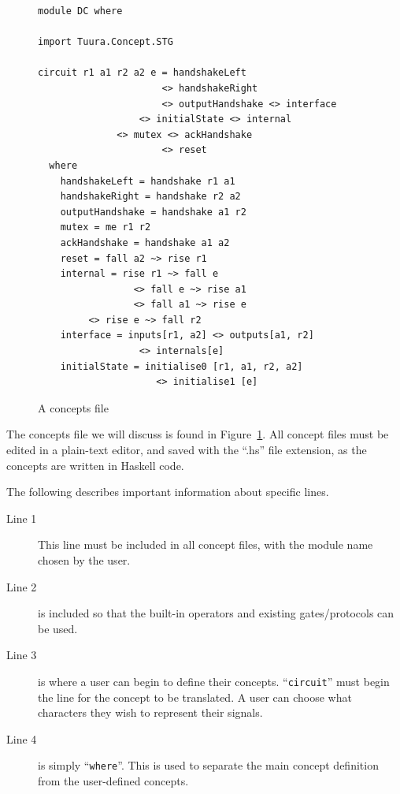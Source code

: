 \documentclass[british,conference,compsoc]{IEEEtran}
\begin{document}
\begin{figure}[h]
\begin{centering}

\begin{lstlisting}
module DC where

import Tuura.Concept.STG

circuit r1 a1 r2 a2 e = handshakeLeft 
                      <> handshakeRight 
                      <> outputHandshake <> interface 
	              <> initialState <> internal 
		      <> mutex <> ackHandshake 
                      <> reset
  where
  	handshakeLeft = handshake r1 a1
  	handshakeRight = handshake r2 a2
  	outputHandshake = handshake a1 r2
  	mutex = me r1 r2 
  	ackHandshake = handshake a1 a2
	reset = fall a2 ~> rise r1
  	internal = rise r1 ~> fall e 
                 <> fall e ~> rise a1 
                 <> fall a1 ~> rise e
		 <> rise e ~> fall r2
	interface = inputs[r1, a2] <> outputs[a1, r2] 
                  <> internals[e]
	initialState = initialise0 [r1, a1, r2, a2] 
                     <> initialise1 [e]
\end{lstlisting}

\par\end{centering}
\vspace{-2mm}
\begin{centering}
\protect\caption{\label{fig:concepts_file}A concepts file}
\vspace{-2mm}
\par\end{centering}

\end{figure}

The concepts file we will discuss is found in Figure~\ref{fig:concepts_file}.
All concept files must be edited in a plain-text editor, and saved with the 
``.hs'' file extension, as the concepts are written in Haskell code. 

The following describes important information about specific lines.

\begin{description}
  \item [Line 1]  This line must be included in all concept files, with the 
  module name chosen by the user.
  
  \item [Line 2] is included so that the built-in operators and existing 
  gates/protocols can be used. 
  
  \item [Line 3] is where a user can begin to define their concepts. 
  ``\texttt{circuit}'' must begin the line for the concept to be translated.
  A user can choose what characters they wish to represent their signals.
  
  \item [Line 4] is simply ``\texttt{where}''. This is used to separate the main
  concept definition from the user-defined concepts.

\end{description}
\end{document}
